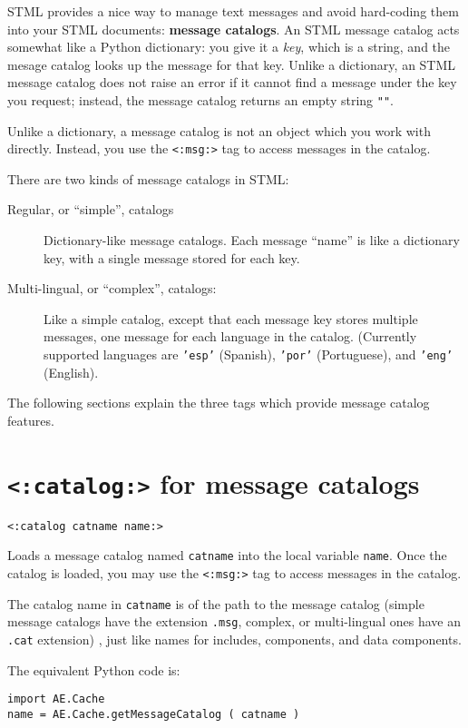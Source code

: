 \documentclass{manual}
\begin{document}
STML provides a nice way to manage text messages
and avoid hard-coding them into your STML documents:
\textbf{message catalogs}. An STML message catalog acts somewhat
like a Python dictionary: you give it a \emph{key},
which is a string, and the mesage catalog looks up
the message for that key. Unlike a dictionary, an STML
message catalog does not raise an error if it cannot
find a message under the key you request; instead,
the message catalog returns an empty string \texttt{""}.

Unlike a dictionary, a message catalog is not an object
which you work with directly. Instead,
you use the \texttt{<:msg:>} tag to access messages
in the catalog.

There are two kinds of message catalogs in STML:

\begin{description}
\item[Regular, or ``simple'', catalogs] Dictionary-like
message catalogs. Each message ``name'' is like a dictionary
key, with a single message stored for each key.

\item[Multi-lingual, or ``complex'', catalogs:] Like a
simple catalog, except that each message key stores
multiple messages, one message for each language in the
catalog. (Currently supported languages are \texttt{'esp'} (Spanish),
\texttt{'por'} (Portuguese), and \texttt{'eng'} (English). 
\end{description}

The following sections explain the three tags which
provide message catalog features.


\section{\texttt{<:catalog:>} for message catalogs}
\label{tagcatalog}

\texttt{<:catalog catname name:>}

Loads a  message catalog 
named \texttt{catname} into the local variable 
\texttt{name}. Once the catalog is loaded, you may
use the \texttt{<:msg:>} 
tag to access messages in the catalog.

The catalog name in \texttt{catname} is of the path to the message
catalog (simple message catalogs have the extension \texttt{.msg}, complex, or multi-lingual ones have an \texttt{.cat} extension)
, just like names for includes,
components, and data components.

The equivalent Python code is:
\begin{verbatim}
import AE.Cache
name = AE.Cache.getMessageCatalog ( catname )
\end{verbatim}
\end{document}
